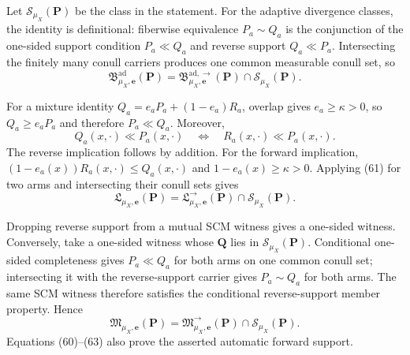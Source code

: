 Let \(\mathcal S_{\mu_X}(\boldsymbol P)\) be the class in the statement.  For the adaptive divergence classes, the identity is definitional: fiberwise equivalence \(P_a\sim Q_a\) is the conjunction of the one-sided support condition \(P_a\ll Q_a\) and reverse support \(Q_a\ll P_a\).  Intersecting the finitely many conull carriers produces one common measurable conull set, so
\[
 \mathfrak B^{\mathrm{ad}}_{\mu_X,\boldsymbol e}(\boldsymbol P)
 =\mathfrak B^{\mathrm{ad},\to}_{\mu_X,\boldsymbol e}(\boldsymbol P)
  \cap\mathcal S_{\mu_X}(\boldsymbol P). \tag{60}
\]

For a mixture identity \(Q_a=e_aP_a+(1-e_a)R_a\), overlap gives \(e_a\ge\kappa>0\), so \(Q_a\ge e_aP_a\) and therefore \(P_a\ll Q_a\).  Moreover,
\[
 Q_a(x,\cdot)\ll P_a(x,\cdot)
 \quad\Longleftrightarrow\quad
 R_a(x,\cdot)\ll P_a(x,\cdot). \tag{61}
\]
The reverse implication follows by addition.  For the forward implication, \((1-e_a(x))R_a(x,\cdot)\le Q_a(x,\cdot)\) and \(1-e_a(x)\ge\kappa>0\).  Applying (61) for two arms and intersecting their conull sets gives
\[
 \mathfrak L_{\mu_X,\boldsymbol e}(\boldsymbol P)
 =\mathfrak L^{\to}_{\mu_X,\boldsymbol e}(\boldsymbol P)
  \cap\mathcal S_{\mu_X}(\boldsymbol P). \tag{62}
\]

Dropping reverse support from a mutual SCM witness gives a one-sided witness.  Conversely, take a one-sided witness whose \(\boldsymbol Q\) lies in \(\mathcal S_{\mu_X}(\boldsymbol P)\).  Conditional one-sided completeness gives \(P_a\ll Q_a\) for both arms on one common conull set; intersecting it with the reverse-support carrier gives \(P_a\sim Q_a\) for both arms.  The same SCM witness therefore satisfies the conditional reverse-support member property.  Hence
\[
 \mathfrak M_{\mu_X,\boldsymbol e}(\boldsymbol P)
 =\mathfrak M^{\to}_{\mu_X,\boldsymbol e}(\boldsymbol P)
  \cap\mathcal S_{\mu_X}(\boldsymbol P). \tag{63}
\]
Equations (60)--(63) also prove the asserted automatic forward support.